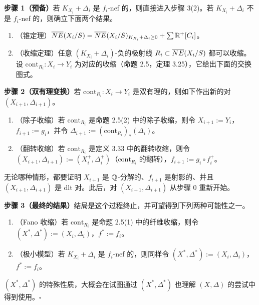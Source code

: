 \par\medskip\noindent\textbf{步骤 1（预备）}\quad 若 $K_{X_i}+\Delta_i$ 是 $f_i$-nef 的，则直接进入步骤 3(2)。若 $K_{X_i}+\Delta_i$ 不是 $f_i$-nef 的，则确立下面两个结果。
\begin{enumerate}[label=（\arabic*）,leftmargin=2.8em,itemsep=1pt,topsep=2pt,parsep=0pt]
\item （锥定理）$\overline{NE}(X_i/S)=\overline{NE}(X_i/S)_{K_{X_i}+\Delta_i\ge 0}+\sum\mathbb{R}^+[C_i]$。
\item （收缩定理）任意 $(K_{X_i}+\Delta_i)$-负的极射线 $R_i\subset\overline{NE}(X_i/S)$ 都可以收缩。设 $\mathrm{cont}_{R_i}:X_i\to Y_i$ 为对应的收缩（命题 2.5，定理 3.25），它给出下面的交换图式。
\end{enumerate}
\begin{center}
\end{center}

\par\medskip\noindent\textbf{步骤 2（双有理变换）}\quad 若 $\mathrm{cont}_{R_i}:X_i\to Y_i$ 是双有理的，则如下作出新的对 $(X_{i+1},\Delta_{i+1})$。
\begin{enumerate}[label=（\arabic*）,leftmargin=2.8em,itemsep=1pt,topsep=2pt,parsep=0pt]
\item （除子收缩）若 $\mathrm{cont}_{R_i}$ 是命题 2.5(2) 中的除子收缩，则令 $X_{i+1}:=Y_i$，$f_{i+1}:=g_i$，并令 $\Delta_{i+1}:=(\mathrm{cont}_{R_i})_*(\Delta_i)$。
\item （翻转收缩）若 $\mathrm{cont}_{R_i}$ 是定义 3.33 中的翻转收缩，则令 $(X_{i+1},\Delta_{i+1}):=(X_i^+,\Delta_i^+)$（$\mathrm{cont}_{R_i}$ 的翻转），$f_{i+1}:=g_i\circ f_i^+$。
\end{enumerate}
无论哪种情形，都要证明 $X_{i+1}$ 是 $\mathbb{Q}$-分解的、$f_{i+1}$ 是射影的、并且 $(X_{i+1},\Delta_{i+1})$ 是 dlt 对。此后，对 $(X_{i+1},\Delta_{i+1})$ 从步骤 0 重新开始。

\par\medskip\noindent\textbf{步骤 3（最终的结果）}\quad 结局是这个过程终止，并可望得到下列两种可能性之一。
\begin{enumerate}[label=（\arabic*）,leftmargin=2.8em,itemsep=1pt,topsep=2pt,parsep=0pt]
\item （Fano 收缩）若 $\mathrm{cont}_{R_i}$ 是命题 2.5(1) 中的纤维收缩，则令 $(X^*,\Delta^*):=(X_i,\Delta_i)$，$f^*:=f_i$。
\item （极小模型）若 $K_{X_i}+\Delta_i$ 是 $f_i$-nef 的，则同样令 $(X^*,\Delta^*):=(X_i,\Delta_i)$，$f^*:=f_i$。
\end{enumerate}
$(X^*,\Delta^*)$ 的特殊性质，大概会在试图通过 $(X^*,\Delta^*)$ 也理解 $(X,\Delta)$ 的尝试中得到使用。\hfill$\square$
